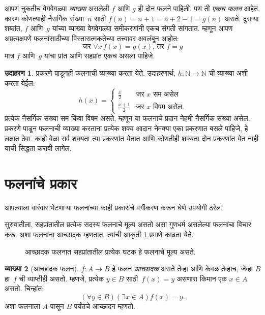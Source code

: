 \documentclass[11pt,a4paper,openany]{book}
\theoremstyle{definition}
\newtheorem{defn}{व्याख्या}[section]
\newtheorem{ex}[defn]{उदाहरण}
\newenvironment{explain}{}{}
\newcommand{\Nat}{\mathbb{N}}
\newcommand{\olasset}[2][0.52\textwidth]{\centering\resizebox{#1}{!}{}}
\begin{document}
\begin{explain}
आपण नुकतीच वेगवेगळ्या \emph{व्याख्या} असलेली $f$ आणि $g$ ही दोन
फलने पाहिली. पण ती \emph{एकच फलन} आहेत. कारण कोणत्याही नैसर्गिक
संख्या~$n$ साठी $f(n) = n+1 = n+2-1 = g(n)$ असते. दुसऱ्या शब्दांत,
$f$ आणि~$g$ यांच्या व्याख्या वेगवेगळ्या समीकरणांनी एकच संगती सांगतात.
म्हणून आपण अप्रत्यक्षपणे फलनांसाठीच्या विस्तारात्मकतेच्या तत्त्वावर
अवलंबून आहोत:
\[
  \text{जर }\forall x\, f(x) = g(x)\text{, तर }f = g
\]
मात्र $f$ आणि~$g$ यांचा प्रांत आणि सहप्रांत एकच असला पाहिजे.
\end{explain}

\begin{ex}
प्रकरणे पाडूनही फलनाची व्याख्या करता येते. उदाहरणार्थ,
$h \colon \Nat \to \Nat$ ची व्याख्या अशी करता येईल:
\[
h(x) =
\begin{cases}
  \frac{x}{2} & \text{जर $x$ सम असेल} \\
  \frac{x+1}{2} & \text{जर $x$ विषम असेल.}
\end{cases}
\]
प्रत्येक नैसर्गिक संख्या सम किंवा विषम असते, म्हणून या फलनाचे प्रदान
नेहमी नैसर्गिक संख्या असेल. प्रकरणे पाडून फलनाची व्याख्या करताना
प्रत्येक शक्य आदान नेमक्या एका प्रकरणात बसले पाहिजे, हे लक्षात ठेवा.
काही वेळा सर्व शक्यता त्या प्रकरणांत येतात आणि कोणतीही शक्यता दोन
प्रकरणांत येत नाही याची सिद्धता करावी लागेल.
\end{ex}








\section{फलनांचे प्रकार}\label{sfr:fun:kin:sec}

\begin{explain}
आपल्याला वारंवार भेटणाऱ्या फलनांच्या काही प्रकारांचे वर्गीकरण करून
घेणे उपयोगी ठरेल.

सुरुवातीला, सहप्रांतातील प्रत्येक सदस्य फलनाचे मूल्य असतो असा गुणधर्म
असलेल्या फलनांचा विचार करू. अशा फलनांना आच्छादक म्हणतात.
त्यांची आकृती \ref{sfr:fun:kin:fig:surjective} प्रमाणे काढता येते.

\begin{figure}
  \olasset{assets/diagrams/surjective.tikz}
  \caption{आच्छादक फलनात सहप्रांतातील प्रत्येक घटक
    हे फलनाचे मूल्य असते.}
  \label{sfr:fun:kin:fig:surjective}
\end{figure}
\end{explain}

\begin{defn}[आच्छादक फलन]
$f \colon A \rightarrow B$ हे फलन \emph{आच्छादक} असते तेव्हा
आणि केवळ तेव्हाच, जेव्हा $B$ हा~$f$ ची व्याप्तीही असतो. म्हणजे,
प्रत्येक $y \in B$ साठी~$f(x) = y$ असणारा किमान एक $x \in A$
असतो. चिन्हांत:
\[
  (\forall y \in B)(\exists x \in A)f(x) = y.
\]
अशा फलनाला $A$ पासून $B$ पर्यंतचे आच्छादन म्हणतो.
\end{defn}
\end{document}
